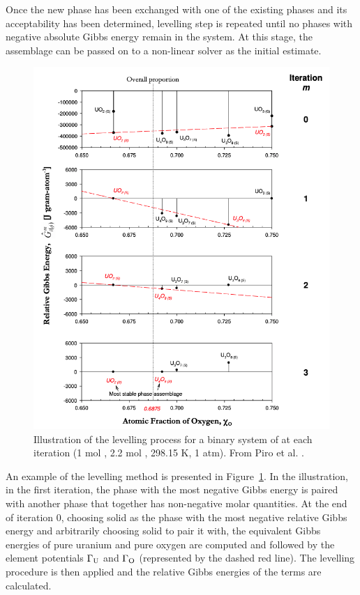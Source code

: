 	Once the new phase has been exchanged with one of the existing phases and its acceptability has been determined, levelling step is repeated until no phases with negative absolute Gibbs energy remain in the system. At this stage, the assemblage can be passed on to a non-linear solver as the initial estimate.
	\begin{figure}[ht]
		\centering
		\includegraphics[width=\textwidth]{figures/chapter-6/Levelling_illustration}
		\caption[Illustration of the levelling process for a binary system of  at each iteration (1 \si{\mole} , 2.2 \si{\mole} , 298.15 \si{\kelvin}, 1 \si{atm}).]{Illustration of the levelling process for a binary system of  at each iteration (1 \si{\mole} , 2.2 \si{\mole} , 298.15 \si{\kelvin}, 1 \si{atm}). From Piro et al. \cite{Piro11b}.}
		\label{fig:lev_illus}
	\end{figure}

	An example of the levelling method is presented in Figure~\ref{fig:lev_illus}. In the illustration, in the first iteration, the phase with the most negative Gibbs energy is paired with another phase that together has non-negative molar quantities. At the end of iteration 0, choosing solid  as the phase with the most negative relative Gibbs energy and arbitrarily choosing solid  to pair it with, the equivalent Gibbs energies of pure uranium and pure oxygen are computed and followed by the element potentials $\Gamma_{\ce{U}}$ and $\Gamma_{\ce{O}}$ (represented by the dashed red line). The levelling procedure is then applied and the relative Gibbs energies of the terms are calculated.

